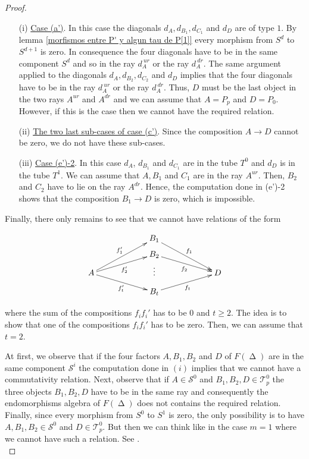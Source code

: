 \documentclass{amsart}
\theoremstyle{plain}
\theoremstyle{definition}
\begin{document}
\begin{proof}
  

\begin{itemize}

  \item [(i)] \underline{Case (a')}. In this case the diagonals $d_A,d_{B_1},d_{C_1}$ and $d_D$ are of type $1$. By lemma \ref{morfismos entre P' y algun tau de P[1]} every morphism from $S^d$ to $S^{d+1}$ is zero. In consequence the four diagonals have to be in the same component $S^d$ and so in the ray $d_A^{ \ ur}$ or the ray $d_A^{ \ dr}$. The same argument applied to the  diagonals $d_A,d_{B_2},d_{C_2}$ and $d_D$ implies that the  four diagonals have to be in the ray $d_A^{ \ ur}$ or the ray $d_A^{ \ dr}$. Thus, $D$ must be the last  object in the two rays  $A^{ ur}$ and  $A^{dr}$ and we can assume that $A=P_p$ and $D=P_0$. However, if  this is the case then we cannot have the required relation.\\

  \item [(ii)] \underline{The two last sub-cases of case (c')}. Since the composition $A\rightarrow D$ cannot be zero, we do not have these sub-cases.\\

  \item  [(iii)] \underline{Case (e')-2}. In this case $d_A$, $d_{B_1}$  and $d_{C_1}$ are in the tube $T^0$ and $d_D$ is in the tube $T^1$. We can assume that $A, B_1$ and  $C_1$ are in the ray $A^{ur}$.  Then, $B_2$ and $C_2$ have to lie on the ray $A^{dr}$. Hence, the computation done in   (e')-2 shows that the  composition $B_1\rightarrow D$ is zero, which is impossible. \\
\end{itemize}

Finally, there only remains to see that we cannot have relations of the  form

\[\xymatrix@R=0.4pc@C=5pc{
& B_1\ar[ddr]^{f_1}&\\
& B_2\ar[dr]_{f_2}& \\
A \ar[uur]^{f_1'}\ar[ur]_{f_2'}\ar[dr]_{f_t'}& \vdots & D\\
& B_t\ar[ur]_{f_t}&\\
}\]

where the sum of the compositions  $f_i f_i'$ has to be $0$ and $t\geq 2$.  The idea is to show that one of the  compositions $f_i f_i'$ has to be zero. Then, we can assume that  $t=2$.

 At first, we observe that if the four  factors $A,B_1,B_2$ and $D$ of $F({\mathop{\Delta}\nolimits})$ are in the same component $\mathcal{S}^i$ the computation done  in  $(i)$ implies that we cannot have a commutativity relation. Next, observe that if  $A\in \mathcal{S}^0$ and   $B_1,B_2,D\in \mathcal{T}^0_p$ the three objects $B_1,B_2,D$ have to be in the same ray and consequently the endomorphisms algebra of  $F({\mathop{\Delta}\nolimits})$ does not contains the required   relation. Finally, since every morphism from    $S^0$ to  $S^1$ is zero, the only possibility is to have $A,B_1,B_2\in \mathcal{S}^0$ and $D\in \mathcal{T}^0_p$. But then we can think like in the case  $m=1$  where we  cannot have such a relation. See \cite[Proposition 3.1]{Murphy2010}.\\


\end{proof}
\end{document}
